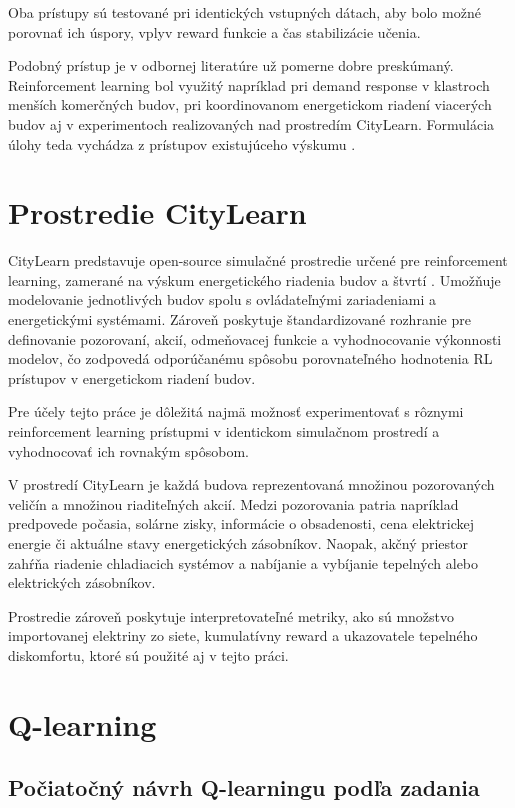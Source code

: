 \documentclass[conference]{IEEEtran}
\begin{document}
Oba prístupy sú testované pri identických vstupných dátach, aby bolo možné porovnať ich úspory, vplyv reward funkcie a čas stabilizácie učenia.

Podobný prístup je v odbornej literatúre už pomerne dobre preskúmaný. Reinforcement learning bol využitý napríklad pri demand response v klastroch menších komerčných budov, pri koordinovanom energetickom riadení viacerých budov aj v experimentoch realizovaných nad prostredím CityLearn. Formulácia úlohy teda vychádza z prístupov existujúceho výskumu \cite{b17,b18,b19,b20}.


\section{Prostredie CityLearn}

CityLearn predstavuje open-source simulačné prostredie určené pre reinforcement learning, zamerané na výskum energetického riadenia budov a štvrtí \cite{b1}. Umožňuje modelovanie jednotlivých budov spolu s ovládateľnými zariadeniami a energetickými systémami. Zároveň poskytuje štandardizované rozhranie pre definovanie pozorovaní, akcií, odmeňovacej funkcie a vyhodnocovanie výkonnosti modelov, čo zodpovedá odporúčanému spôsobu porovnateľného hodnotenia RL prístupov v energetickom riadení budov.

Pre účely tejto práce je dôležitá najmä možnosť experimentovať s rôznymi reinforcement learning prístupmi v identickom simulačnom prostredí a vyhodnocovať ich rovnakým spôsobom.

V prostredí CityLearn je každá budova reprezentovaná množinou pozorovaných veličín a množinou riaditeľných akcií. Medzi pozorovania patria napríklad predpovede počasia, solárne zisky, informácie o obsadenosti, cena elektrickej energie či aktuálne stavy energetických zásobníkov. Naopak, akčný priestor zahŕňa riadenie chladiacich systémov a nabíjanie a vybíjanie tepelných alebo elektrických zásobníkov.

Prostredie zároveň poskytuje interpretovateľné metriky, ako sú množstvo importovanej elektriny zo siete, kumulatívny reward a ukazovatele tepelného diskomfortu, ktoré sú použité aj v tejto práci.

\section{Q-learning}

\subsection{Počiatočný návrh Q-learningu podľa zadania}
\end{document}
